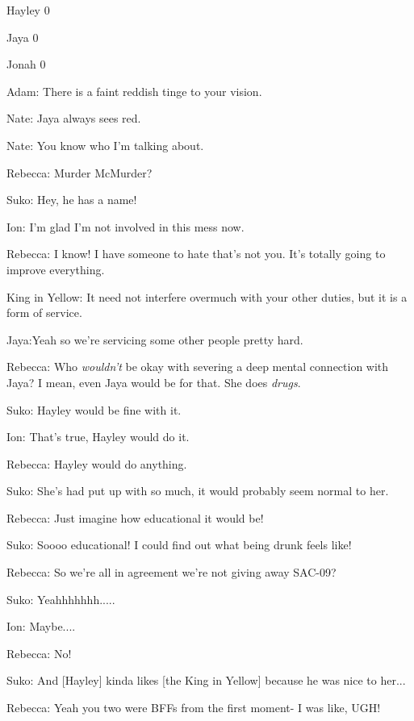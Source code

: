 
Hayley 0

Jaya 0

Jonah 0





Adam: There is a faint reddish tinge to your vision.

Nate: Jaya always sees red.



Nate: You know who I'm talking about.

Rebecca: Murder McMurder?

Suko: Hey, he has a name!



Ion: I'm glad I'm not involved in this mess now.

Rebecca: I know!  I have someone to hate that's not you.  It's totally going to improve everything.



King in Yellow: It need not interfere overmuch with your other duties, but it is a form of service.

Jaya:Yeah so we're servicing some other people pretty hard.



Rebecca: Who \textit{wouldn't} be okay with severing a deep mental connection with Jaya?  I mean, even Jaya would be for that.  She does \textit{drugs}.

Suko: Hayley would be fine with it.

Ion: That's true, Hayley would do it.

Rebecca: Hayley would do anything.

Suko: She's had put up with so much, it would probably seem normal to her.

Rebecca: Just imagine how educational it would be!

Suko: Soooo educational!  I could find out what being drunk feels like!



Rebecca: So we're all in agreement we're not giving away SAC-09?

Suko: Yeahhhhhhh.....

Ion: Maybe....

Rebecca: No!



Suko: And {[}Hayley{]} kinda likes {[}the King in Yellow{]} because he was nice to her...

Rebecca: Yeah you two were BFFs from the first moment- I was like, UGH!



